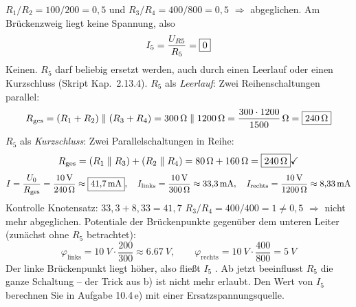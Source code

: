 \documentclass[11pt,a4paper]{article}
\begin{document}
\begin{loesung}
$R_1/R_2 = 100/200 = 0{,}5$ und $R_3/R_4 = 400/800 = 0{,}5$ $\Rightarrow$ abgeglichen. Am Brückenzweig liegt keine Spannung, also
\[
  I_5 = \frac{U_{R5}}{R_5} = \boxed{0}
\]
Keinen. $R_5$ darf beliebig ersetzt werden, auch durch einen Leerlauf oder einen Kurzschluss (Skript Kap.~2.13.4).
$R_5$ als \emph{Leerlauf}: Zwei Reihenschaltungen parallel:
\[
  R_\text{ges} = (R_1+R_2)\parallel(R_3+R_4) = \SI{300}{\ohm}\parallel\SI{1200}{\ohm} = \frac{300\cdot 1200}{1500}\,\si{\ohm} = \boxed{\SI{240}{\ohm}}
\]
$R_5$ als \emph{Kurzschluss}: Zwei Parallelschaltungen in Reihe:
\[
  R_\text{ges} = (R_1\parallel R_3)+(R_2\parallel R_4) = \SI{80}{\ohm}+\SI{160}{\ohm} = \boxed{\SI{240}{\ohm}} \checkmark
\]
\[
  I = \frac{U_0}{R_\text{ges}} = \frac{\SI{10}{V}}{\SI{240}{\ohm}} \approx \boxed{\SI{41.7}{mA}},\quad
  I_\text{links} = \frac{\SI{10}{V}}{\SI{300}{\ohm}} \approx \SI{33.3}{mA},\quad
  I_\text{rechts} = \frac{\SI{10}{V}}{\SI{1200}{\ohm}} \approx \SI{8.33}{mA}
\]
Kontrolle Knotensatz: $33{,}3 + 8{,}33 = 41{,}7$ \checkmark
{}
$R_3/R_4 = 400/400 = 1 \neq 0{,}5$ $\Rightarrow$ nicht mehr abgeglichen. Potentiale der Brückenpunkte gegenüber dem unteren Leiter (zunächst ohne $R_5$ betrachtet):
\[
  \varphi_\text{links} = \SI{10}{V}\cdot\frac{200}{300} \approx \SI{6.67}{V},\qquad
  \varphi_\text{rechts} = \SI{10}{V}\cdot\frac{400}{800} = \SI{5}{V}
\]
Der linke Brückenpunkt liegt höher, also fließt $I_5$ . Ab jetzt beeinflusst $R_5$ die ganze Schaltung -- der Trick aus b) ist nicht mehr erlaubt. Den Wert von $I_5$ berechnen Sie in Aufgabe 10.4\,e) mit einer Ersatzspannungsquelle.
\end{loesung}
\end{document}
